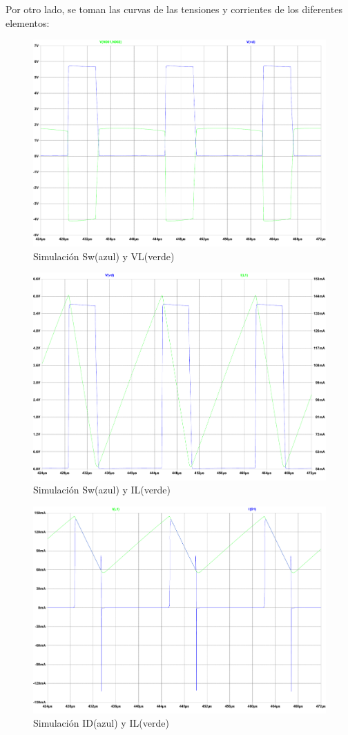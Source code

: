 \documentclass[e4_tp1_main.tex]{subfiles}
\begin{document}
\newpage
Por otro lado, se toman las curvas de las tensiones y corrientes de los diferentes elementos:

\begin{figure}[H]
\centering
\includegraphics[width=0.7\linewidth]{Imagenes/Punto3/Sw-VL.pdf}
\caption{Simulación Sw(azul) y VL(verde)}
\end{figure}

\begin{figure}[H]
\centering
\includegraphics[width=0.7\linewidth]{Imagenes/Punto3/Sw-IL.pdf}
\caption{Simulación Sw(azul) y IL(verde)}
\end{figure}

\begin{figure}[H]
\centering
\includegraphics[width=0.7\linewidth]{Imagenes/Punto3/ID-IL.pdf}
\caption{Simulación ID(azul) y IL(verde)}
\end{figure}
\end{document}
